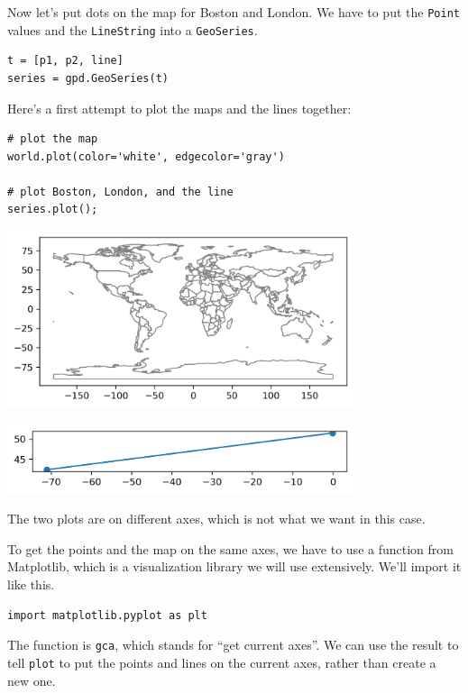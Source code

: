 Now let's put dots on the map for Boston and London. We have to put the
\passthrough{\lstinline!Point!} values and the
\passthrough{\lstinline!LineString!} into a
\passthrough{\lstinline!GeoSeries!}.

\begin{lstlisting}[]
t = [p1, p2, line]
series = gpd.GeoSeries(t)
\end{lstlisting}

Here's a first attempt to plot the maps and the lines together:

\begin{lstlisting}[]
# plot the map
world.plot(color='white', edgecolor='gray')

# plot Boston, London, and the line
series.plot();
\end{lstlisting}

\begin{center}
\includegraphics[width=4in]{02_times_files/02_times_126_0.png}
\end{center}

\begin{center}
\includegraphics[width=4in]{02_times_files/02_times_126_1.png}
\end{center}

The two plots are on different axes, which is not what we want in this
case.

To get the points and the map on the same axes, we have to use a
function from Matplotlib, which is a visualization library we will use
extensively. We'll import it like this.

\begin{lstlisting}[]
import matplotlib.pyplot as plt
\end{lstlisting}

The function is \passthrough{\lstinline!gca!}, which stands for ``get
current axes''. We can use the result to tell
\passthrough{\lstinline!plot!} to put the points and lines on the
current axes, rather than create a new one.

